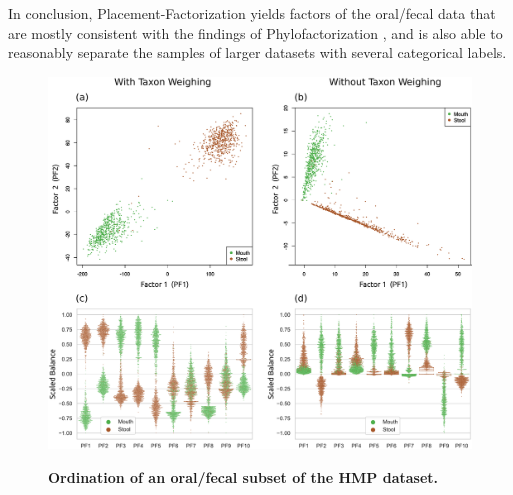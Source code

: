 In conclusion, Placement-Factorization yields factors of the oral/fecal data
that are mostly consistent with the findings of Phylofactorization \cite{Washburne2017a},
and is also able to reasonably separate the samples of larger datasets with several categorical labels.

\begin{figure}[!htb]
    \centering
     \includegraphics[width=\linewidth]{pdf/hmp_pf_of_600_factor_ordination.pdf}
    \begin{subfigure}{0pt}
        \label{fig:hmp_pf_of_600_factor_ordination:sub:2d_with_taxon_weighting}
    \end{subfigure}
    \begin{subfigure}{0pt}
        \label{fig:hmp_pf_of_600_factor_ordination:sub:2d_without_taxon_weighting}
    \end{subfigure}
    \begin{subfigure}{0pt}
        \label{fig:hmp_pf_of_600_factor_ordination:sub:10d_with_taxon_weighting}
    \end{subfigure}
    \begin{subfigure}{0pt}
        \label{fig:hmp_pf_of_600_factor_ordination:sub:10d_without_taxon_weighting}
    \end{subfigure}
    \caption[Ordination of an oral/fecal subset of the \acs{HMP} dataset]{
        \textbf{Ordination of an oral/fecal subset of the \ac{HMP} dataset.}
}
\end{figure}
